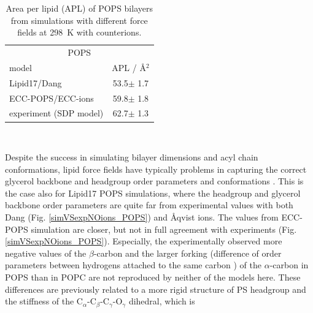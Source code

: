 \documentclass[journal=jpcbfk,manuscript=article]{achemso}
\begin{document}
\begin{table}[tb!] 
\centering
  \caption{Area per lipid (APL) of POPS bilayers from simulations with different force fields at 298~K with  counterions. \label{tab:apls} } 
  \begin{tabular}{l|c } 
    \multicolumn{2}{c}{POPS} \\
    model          & APL / Å$^2$    \\ 
    \hline 
    Lipid17/Dang              & 53.5$\pm$ 1.7   \\ 
    ECC-POPS/ECC-ions         & 59.8$\pm$ 1.8   \\ 
    experiment (SDP model) \citep{kucerka14} & 62.7$\pm$ 1.3  \\ 
  \end{tabular} \\
\end{table} 

Despite the success in simulating bilayer dimensions and acyl chain conformations,
lipid force fields have typically problems in capturing the correct glycerol backbone and
headgroup order parameters and conformations \cite{botan15,ollila16,NMRlipidsIV}.
This is the case also for Lipid17 POPS simulations, where the headgroup and glycerol backbone
order parameters are quite far from experimental values with both Dang (Fig. \ref{simVSexpNOions_POPS})
and {\AA}qvist \cite{NMRlipidsIV} ions. The values from ECC-POPS simulation are closer,
but not in full agreement with experiments (Fig. \ref{simVSexpNOions_POPS}).
Especially, the experimentally observed more negative values of the $\beta$-carbon
and the larger forking (difference of order parameters between hydrogens attached to the
same carbon \cite{ollila16}) of the $\alpha$-carbon in POPS than in POPC \cite{NMRlipidsIV}
are not reproduced by neither of the models here. These differences are previously related
to a more rigid structure of PS headgroup and the stiffness of the C$_\alpha$-C$_\beta$-C$_\gamma$-O$_\gamma$
dihedral, which is 

\end{document}
